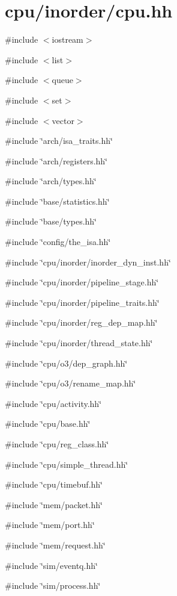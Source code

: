 \hypertarget{inorder_2cpu_8hh}{
\section{cpu/inorder/cpu.hh}
\label{inorder_2cpu_8hh}
}
{\ttfamily \#include $<$iostream$>$}\par
{\ttfamily \#include $<$list$>$}\par
{\ttfamily \#include $<$queue$>$}\par
{\ttfamily \#include $<$set$>$}\par
{\ttfamily \#include $<$vector$>$}\par
{\ttfamily \#include \char`\"{}arch/isa\_\-traits.hh\char`\"{}}\par
{\ttfamily \#include \char`\"{}arch/registers.hh\char`\"{}}\par
{\ttfamily \#include \char`\"{}arch/types.hh\char`\"{}}\par
{\ttfamily \#include \char`\"{}base/statistics.hh\char`\"{}}\par
{\ttfamily \#include \char`\"{}base/types.hh\char`\"{}}\par
{\ttfamily \#include \char`\"{}config/the\_\-isa.hh\char`\"{}}\par
{\ttfamily \#include \char`\"{}cpu/inorder/inorder\_\-dyn\_\-inst.hh\char`\"{}}\par
{\ttfamily \#include \char`\"{}cpu/inorder/pipeline\_\-stage.hh\char`\"{}}\par
{\ttfamily \#include \char`\"{}cpu/inorder/pipeline\_\-traits.hh\char`\"{}}\par
{\ttfamily \#include \char`\"{}cpu/inorder/reg\_\-dep\_\-map.hh\char`\"{}}\par
{\ttfamily \#include \char`\"{}cpu/inorder/thread\_\-state.hh\char`\"{}}\par
{\ttfamily \#include \char`\"{}cpu/o3/dep\_\-graph.hh\char`\"{}}\par
{\ttfamily \#include \char`\"{}cpu/o3/rename\_\-map.hh\char`\"{}}\par
{\ttfamily \#include \char`\"{}cpu/activity.hh\char`\"{}}\par
{\ttfamily \#include \char`\"{}cpu/base.hh\char`\"{}}\par
{\ttfamily \#include \char`\"{}cpu/reg\_\-class.hh\char`\"{}}\par
{\ttfamily \#include \char`\"{}cpu/simple\_\-thread.hh\char`\"{}}\par
{\ttfamily \#include \char`\"{}cpu/timebuf.hh\char`\"{}}\par
{\ttfamily \#include \char`\"{}mem/packet.hh\char`\"{}}\par
{\ttfamily \#include \char`\"{}mem/port.hh\char`\"{}}\par
{\ttfamily \#include \char`\"{}mem/request.hh\char`\"{}}\par
{\ttfamily \#include \char`\"{}sim/eventq.hh\char`\"{}}\par
{\ttfamily \#include \char`\"{}sim/process.hh\char`\"{}}\par
